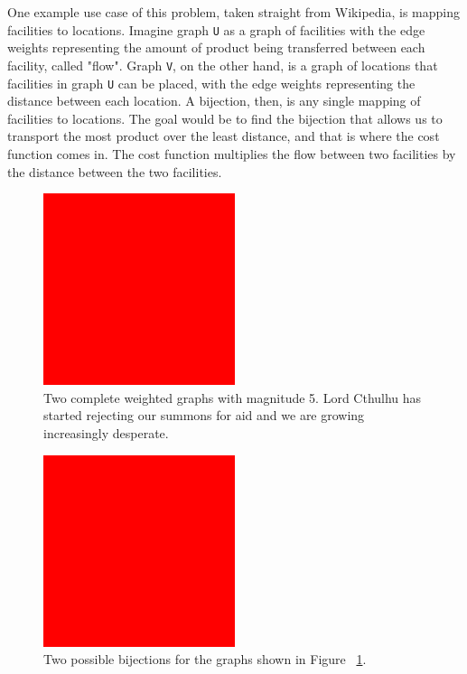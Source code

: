 \documentclass[sigconf]{acmart}
\begin{document}
One example use case of this problem, taken straight from Wikipedia, is mapping facilities to locations. Imagine graph \verb|U| as a graph of facilities with the edge weights representing the amount of product being transferred between each facility, called "flow". Graph \verb|V|, on the other hand, is a graph of locations that facilities in graph \verb|U| can be placed, with the edge weights representing the distance between each location. A bijection, then, is any single mapping of facilities to locations. The goal would be to find the bijection that allows us to transport the most product over the least distance, and that is where the cost function comes in. The cost function multiplies the flow between two facilities by the distance between the two facilities.

\begin {figure}
	\includegraphics [width=0.5\textwidth] {placeholder.png}
	\caption {Two complete weighted graphs with magnitude 5. Lord Cthulhu has started rejecting our summons for aid and we are growing increasingly desperate.}
	\label{fig:tcwgf}
\end {figure}

\begin {figure}
	\includegraphics [width=0.5\textwidth] {placeholder.png}
	\caption {Two possible bijections for the graphs shown in Figure ~\ref{fig:tcwgf}.}
	\label{fig:tcwg_bij}
\end {figure}
\end{document}
